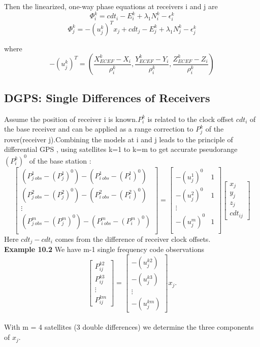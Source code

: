 Then the linearized, one-way phase equations at receivers i and j are
$$
\Phi_{i}^{k}= cdt_{i}-E_{i}^{k}+\lambda_{1}N_{i}^{k}-\epsilon_{i}^{k}
$$
$$
\Phi_{j}^{k}= -(u_{j}^{k})^{T}x_{j}+cdt_{j}-E_{j}^{k}+\lambda_{1}N_{j}^{k}-\epsilon_{j}^{k}
$$

where
\begin{equation}
-(u_{j}^{k})^{T}=(\frac{X_{ECEF}^{k}-X_{i}}{\rho_{i}^{k}},\frac{Y_{ECEF}^{k}-Y_{i}}{\rho_{i}^{k}},\frac{Z_{ECEF}^{k}-Z_{i}}{\rho_{i}^{k}})
\end{equation}

\subsection{DGPS: Single Differences of Receivers}

Assume the position of receiver i is known.$P_{i}^{k}$ is related to the clock offset $cdt_{i}$ of the base receiver and can be applied as a range correction to $P_{j}^{k}$ of the rover(receiver j).Combining the models at i and j leads to the principle of differential GPS , using satellites k=1 to k=m to get accurate pseudorange $(P_{i}^{k})^{0}$ of the base station :
$$
\begin{bmatrix}
(P_{j \ obs}^{1}-(P_{j}^{1})^{0})-(P_{i \ obs}^{1}-(P_{i}^{1})^{0})\\
(P_{j \ obs}^{2}-(P_{j}^{2})^{0})-(P_{i \ obs}^{2}-(P_{i}^{2})^{0})\\
\vdots \\
(P_{j \ obs}^{m}-(P_{j}^{m})^{0})-(P_{i \ obs}^{m}-(P_{i}^{m})^{0})\\
\end{bmatrix}
=
\begin{bmatrix}
-(u_{j}^{1})^{0}&1\\
-(u_{j}^{2})^{0}&1\\
\vdots \\
-(u_{j}^{m})^{0}&1\\
\end{bmatrix}
\begin{bmatrix}
x_{j}\\y_{j}\\z_{j}\\cdt_{ij}
\end{bmatrix}
$$
Here $cdt_{j}-cdt_{i}$ comes from the difference of receiver clock offsets.\\

\textbf{Example 10.2} We have m-1 single frequency code observations
$$
\begin{bmatrix}
P_{ij}^{k2}\\
P_{ij}^{k3}\\
\vdots \\
P_{ij}^{km}
\end{bmatrix}
=\begin{bmatrix}
-(u_{j}^{k2})\\
-(u_{j}^{k3})\\
\vdots \\
-(u_{j}^{km})
\end{bmatrix}
x_{j}.
$$\\
With m = 4 satellites (3 double differences) we determine the three components of $x_{j}$.

